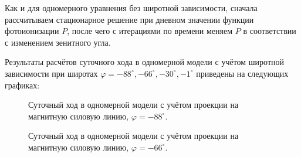 \documentclass[14pt, a4paper, fleqn]{extarticle}
\begin{document}
Как и для одномерного уравнения без широтной зависимости, сначала рассчитываем стационарное решение при дневном значении функции фотоионизации $P$, после чего с итерациями по времени меняем $P$ в соответствии с изменением зенитного угла.

Результаты расчётов суточного хода в одномерной модели с учётом широтной зависимости при широтах $\varphi = -88^\circ, -66^\circ, -30^\circ, -1^\circ$ приведены на следующих графиках:

\begin{figure}[H]
\caption{Суточный ход в одномерной модели с учётом проекции на магнитную силовую линию, $\varphi = -88^\circ$.}
\end{figure}

\begin{figure}[H]
\caption{Суточный ход в одномерной модели с учётом проекции на магнитную силовую линию, $\varphi = -66^\circ$.}
\end{figure}
\end{document}
